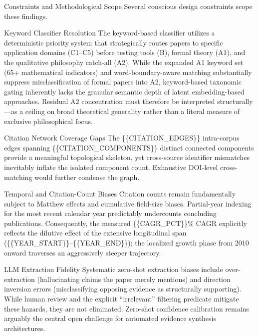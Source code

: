 \documentclass[
  ignorenonframetext,
]{beamer}
\begin{document}
\begin{frame}{Constraints and Methodological Scope}
\protect{}\label{constraints-and-methodological-scope}
Several conscious design constraints scope these findings.

\begin{block}{Keyword Classifier Resolution}
\protect{}\label{keyword-classifier-resolution}
The keyword-based classifier utilizes a deterministic priority system
that strategically routes papers to specific application domains
(C1--C5) before testing tools (B), formal theory (A1), and the
qualitative philosophy catch-all (A2). While the expanded A1 keyword set
(65+ mathematical indicators) and word-boundary-aware matching
substantially suppress misclassification of formal papers into A2,
keyword-based taxonomic gating inherently lacks the granular semantic
depth of latent embedding-based approaches. Residual A2 concentration
must therefore be interpreted structurally---as a ceiling on broad
theoretical generality rather than a literal measure of exclusive
philosophical focus.
\end{block}

\begin{block}{Citation Network Coverage Gaps}
\protect{}\label{citation-network-coverage-gaps}
The \{\{CITATION\_EDGES\}\} intra-corpus edges spanning
\{\{CITATION\_COMPONENTS\}\} distinct connected components provide a
meaningful topological skeleton, yet cross-source identifier mismatches
inevitably inflate the isolated component count. Exhaustive DOI-level
cross-matching would further condense the graph.
\end{block}

\begin{block}{Temporal and Citation-Count Biases}
\protect{}\label{temporal-and-citation-count-biases}
Citation counts remain fundamentally subject to Matthew effects and
cumulative field-size biases. Partial-year indexing for the most recent
calendar year predictably undercounts concluding publications.
Consequently, the measured \{\{CAGR\_PCT\}\}\% CAGR explicitly reflects
the dilutive effect of the extensive longitudinal span
(\{\{YEAR\_START\}\}--\{\{YEAR\_END\}\}); the localized growth phase
from 2010 onward traverses an aggressively steeper trajectory.
\end{block}

\begin{block}{LLM Extraction Fidelity}
\protect{}\label{llm-extraction-fidelity}
Systematic zero-shot extraction biases include over-extraction
(hallucinating claims the paper merely mentions) and direction inversion
errors (misclassifying opposing evidence as structurally supporting).
While human review and the explicit ``irrelevant'' filtering predicate
mitigate these hazards, they are not eliminated. Zero-shot confidence
calibration remains arguably the central open challenge for automated
evidence synthesis architectures.
\end{block}
\end{frame}
\end{document}
